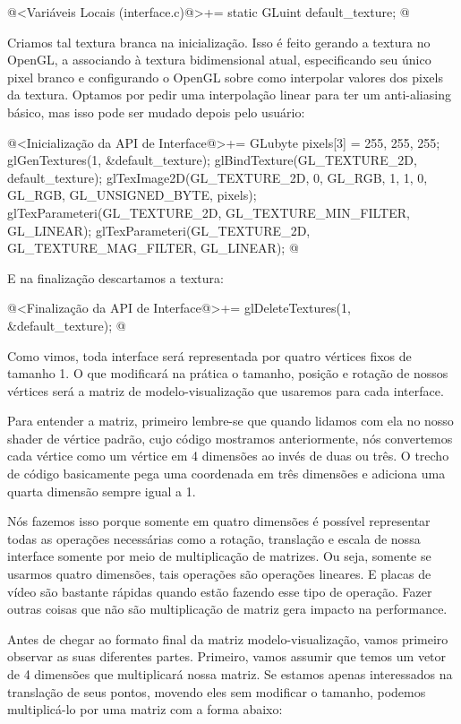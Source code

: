 \iniciocodigo
@<Variáveis Locais (interface.c)@>+=
static GLuint default_texture;
@
\fimcodigo

Criamos tal textura branca na inicialização. Isso é feito gerando a
textura no OpenGL, a associando à textura bidimensional atual,
especificando seu único pixel branco e configurando o OpenGL sobre
como interpolar valores dos pixels da textura. Optamos por pedir uma
interpolação linear para ter um anti-aliasing básico, mas isso pode
ser mudado depois pelo usuário:

\iniciocodigo
@<Inicialização da API de Interface@>+=
{
  GLubyte pixels[3] = {255, 255, 255};
  glGenTextures(1, &default_texture);
  glBindTexture(GL_TEXTURE_2D, default_texture);
  glTexImage2D(GL_TEXTURE_2D, 0, GL_RGB, 1, 1, 0, GL_RGB, GL_UNSIGNED_BYTE,
               pixels);
  glTexParameteri(GL_TEXTURE_2D, GL_TEXTURE_MIN_FILTER, GL_LINEAR);
  glTexParameteri(GL_TEXTURE_2D, GL_TEXTURE_MAG_FILTER, GL_LINEAR);
}
@
\fimcodigo

E na finalização descartamos a textura:

\iniciocodigo
@<Finalização da API de Interface@>+=
glDeleteTextures(1, &default_texture);
@
\fimcodigo


Como vimos, toda interface será representada por quatro vértices fixos
de tamanho 1. O que modificará na prática o tamanho, posição e rotação
de nossos vértices será a matriz de modelo-visualização que usaremos
para cada interface.

Para entender a matriz, primeiro lembre-se que quando lidamos com ela
no nosso shader de vértice padrão, cujo código mostramos
anteriormente, nós convertemos cada vértice como um vértice em 4
dimensões ao invés de duas ou três. O trecho de código
 basicamente pega uma
coordenada em três dimensões e adiciona uma quarta dimensão sempre
igual a 1.

Nós fazemos isso porque somente em quatro dimensões é possível
representar todas as operações necessárias como a rotação, translação
e escala de nossa interface somente por meio de multiplicação de
matrizes. Ou seja, somente se usarmos quatro dimensões, tais operações
são operações lineares. E placas de vídeo são bastante rápidas quando
estão fazendo esse tipo de operação. Fazer outras coisas que não são
multiplicação de matriz gera impacto na performance.

Antes de chegar ao formato final da matriz modelo-visualização, vamos
primeiro observar as suas diferentes partes. Primeiro, vamos assumir
que temos um vetor de 4 dimensões que multiplicará nossa matriz. Se
estamos apenas interessados na translação de seus pontos, movendo eles
sem modificar o tamanho, podemos multiplicá-lo por uma matriz com a
forma abaixo:

